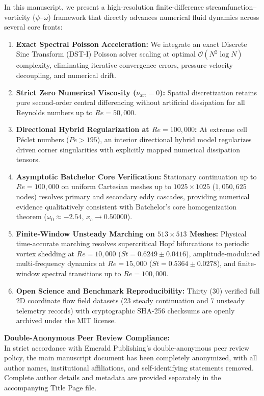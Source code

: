 \documentclass[11pt]{article}
\begin{document}
In this manuscript, we present a high-resolution finite-difference streamfunction--vorticity ($\psi\text{--}\omega$) framework that directly advances numerical fluid dynamics across several core fronts:
\begin{enumerate}
    \item \textbf{Exact Spectral Poisson Acceleration:} We integrate an exact Discrete Sine Transform (DST-I) Poisson solver scaling at optimal $\mathcal{O}(N^2 \log N)$ complexity, eliminating iterative convergence errors, pressure-velocity decoupling, and numerical drift.
    \item \textbf{Strict Zero Numerical Viscosity ($\nu_{\text{art}} = 0$):} Spatial discretization retains pure second-order central differencing without artificial dissipation for all Reynolds numbers up to $Re = 50{,}000$.
    \item \textbf{Directional Hybrid Regularization at $Re = 100{,}000$:} At extreme cell P\'eclet numbers ($Pe > 195$), an interior directional hybrid model regularizes driven corner singularities with explicitly mapped numerical dissipation tensors.
    \item \textbf{Asymptotic Batchelor Core Verification:} Stationary continuation up to $Re = 100{,}000$ on uniform Cartesian meshes up to $1025 \times 1025$ ($1{,}050{,}625$ nodes) resolves primary and secondary eddy cascades, providing numerical evidence qualitatively consistent with Batchelor's core homogenization theorem ($\omega_0 \approx -2.54$, $x_c \to 0.50000$).
    \item \textbf{Finite-Window Unsteady Marching on $513 \times 513$ Meshes:} Physical time-accurate marching resolves supercritical Hopf bifurcations to periodic vortex shedding at $Re = 10{,}000$ ($St = 0.6249 \pm 0.0416$), amplitude-modulated multi-frequency dynamics at $Re = 15{,}000$ ($St = 0.5364 \pm 0.0278$), and finite-window spectral transitions up to $Re = 100{,}000$.
    \item \textbf{Open Science and Benchmark Reproducibility:} Thirty (30) verified full 2D coordinate flow field datasets (23 steady continuation and 7 unsteady telemetry records) with cryptographic SHA-256 checksums are openly archived under the MIT license.
\end{enumerate}

\vspace{0.8em}
\noindent\textbf{Double-Anonymous Peer Review Compliance:} \\
In strict accordance with Emerald Publishing's double-anonymous peer review policy, the main manuscript document has been completely anonymized, with all author names, institutional affiliations, and self-identifying statements removed. Complete author details and metadata are provided separately in the accompanying Title Page file.
\end{document}

